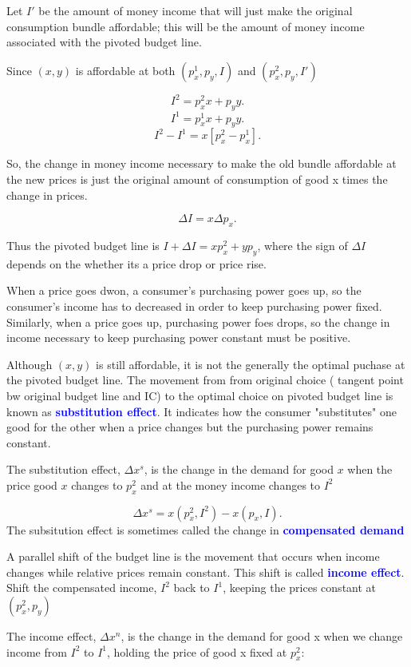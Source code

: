 \documentclass{tufte-handout}
\begin{document}
Let  $I'$ be the amount of  money income that will just make the original consumption bundle affordable; this will be the amount of money income associated with the pivoted budget line.

Since  $(x,y)$ is affordable at both  $(p_x^1,p_y,I)$ and  $(p_x^2,p_y,I')$

\[
I^2 = p_x^2x + p_yy .\] 
\[ I^1 = p_x^1x + p_yy
.\] 
\[ I^2  - I^1 = x[p_x^2 - p_x^1]   .\] 

So, the change in money income necessary to make the old bundle affordable at the new prices is just the original amount of consumption of good x times the change in prices.

\[  \Delta I  = x \Delta p_x .\]

Thus the pivoted budget line is $I + \Delta I = xp_x^2 + yp_y $,
where the sign of  $\Delta I$ depends on the whether its a price drop or price rise. 

When a price goes dwon, a consumer's purchasing power goes up, so the consumer's income has to decreased in order to keep purchasing power fixed. Similarly, when a price goes up, purchasing power foes drops, so the change in income necessary to keep purchasing power constant must be positive.


Although $(x,y)$ is still affordable, it is not the generally the optimal puchase at the pivoted budget line. The movement from from original choice ( tangent point bw original budget line and IC) to the optimal choice on pivoted budget line is known as \textcolor{blue}{\textbf{substitution effect}}. It indicates how the consumer "substitutes" one good for the other when a price changes but the purchasing power remains constant. 

The substitution effect, $\Delta x^s$, is the change in the demand for good  $x$ when the price  good  $x$ changes to  $p_x^2$ and at the money income changes to  $I^2$


\[
\Delta x^s =  x(p_x^2,I^2) - x(p_x,I)
.\] 
The subsitution effect is sometimes called the change in \textcolor{blue}{\textbf{compensated demand}}


A parallel shift of the budget line is the movement that occurs when income changes while relative prices remain constant. This shift is called \textcolor{blue}{\textbf{income effect}}. Shift the compensated income,  $I^2$ back to  $I^1$, keeping the prices constant at  $(p_x^2, p_y)$

The income effect, $\Delta x^n$, is the change in the demand for good x when we change income from  $I^2$ to $I^1$, holding the price of good x fixed at  $p_x^2$:
\end{document}
